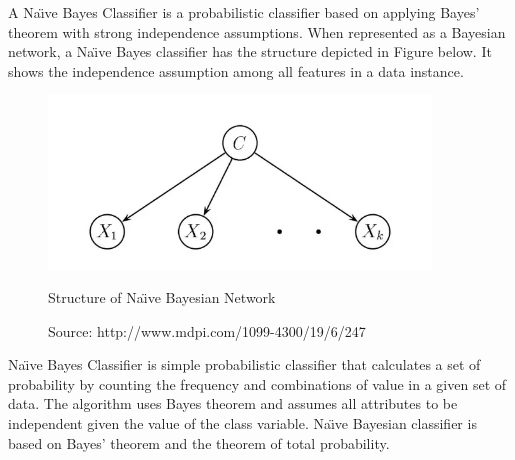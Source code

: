 \par
A Na\"{\i}ve Bayes Classifier is a probabilistic classifier based on applying Bayes’ theorem with strong independence  assumptions. When represented as a Bayesian network, a Na\"{\i}ve Bayes classifier has the structure depicted in Figure below.  \cite{friedman1997bayesian} It shows the independence assumption among all features in a data instance.
\begin{figure}[bh] %
\begin{small}

	\includegraphics[width=4in]{images/naivebayesian.jpg}
	\caption{Structure of Na\"{\i}ve Bayesian Network} %
	\caption*{Source:   http://www.mdpi.com/1099-4300/19/6/247}
	\label{NB} %
\end{small}
\end{figure}

\par
Na\"{\i}ve Bayes Classifier is simple probabilistic classifier that calculates a set of probability by counting the frequency and combinations of value in a given set of data. The algorithm uses Bayes theorem and assumes all attributes to be independent given the value  of  the  class  variable. Na\"{\i}ve Bayesian classifier is based on Bayes’ theorem and the theorem of total probability. 
